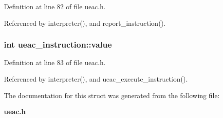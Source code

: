 Definition at line 82 of file ueac.h.

Referenced by interpreter(), and report\_\-instruction().
\subsubsection{\setlength{\rightskip}{0pt plus 5cm}int {\bf ueac\_\-instruction::value}}\label{structueac__instruction_o7}




Definition at line 83 of file ueac.h.

Referenced by interpreter(), and ueac\_\-execute\_\-instruction().

The documentation for this struct was generated from the following file:\begin{CompactItemize}
\item 
{\bf ueac.h}\end{CompactItemize}

